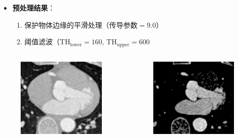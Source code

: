 \begin{frame}
\begin{itemize}
  \item \textbf{预处理结果}：
  \begin{enumerate}
    \item 保护物体边缘的平滑处理（$\text{传导参数} = 9.0$）
    \item 阈值滤波（$\text{TH}_{\text{lower}} = 160$, $\text{TH}_{\text{upper}} = 600$
  \end{enumerate}
\end{itemize}
\begin{columns}[b,onlytextwidth]
\begin{column}{.5\textwidth}
\begin{figure}[t]
\centering
\includegraphics[height=1.5in]{../../Figures/coronary/smooth.eps}
\end{figure}
\end{column}
\begin{column}{.5\textwidth}
\begin{figure}[t]
\centering
\includegraphics[height=1.5in]{../../Figures/coronary/threshold.eps}
\end{figure}
\end{column}
\end{columns}
\end{frame}

